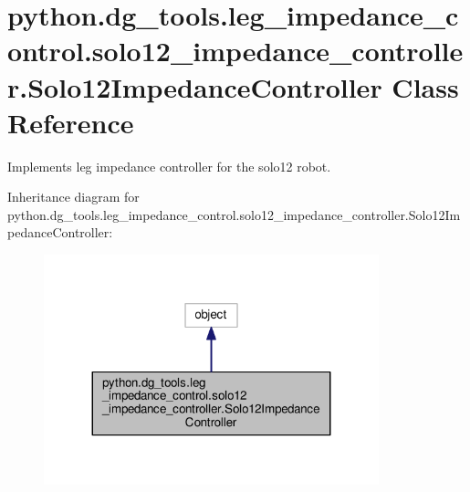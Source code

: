 \hypertarget{classpython_1_1dg__tools_1_1leg__impedance__control_1_1solo12__impedance__controller_1_1Solo12ImpedanceController}{}\section{python.\+dg\+\_\+tools.\+leg\+\_\+impedance\+\_\+control.\+solo12\+\_\+impedance\+\_\+controller.\+Solo12\+Impedance\+Controller Class Reference}
\label{classpython_1_1dg__tools_1_1leg__impedance__control_1_1solo12__impedance__controller_1_1Solo12ImpedanceController}


Implements leg impedance controller for the solo12 robot.  




Inheritance diagram for python.\+dg\+\_\+tools.\+leg\+\_\+impedance\+\_\+control.\+solo12\+\_\+impedance\+\_\+controller.\+Solo12\+Impedance\+Controller\+:
\nopagebreak
\begin{figure}[H]
\begin{center}
\leavevmode
\includegraphics[width=275pt]{classpython_1_1dg__tools_1_1leg__impedance__control_1_1solo12__impedance__controller_1_1Solo12Imda4a48357e96f8799187e352a04853a3}
\end{center}
\end{figure}


